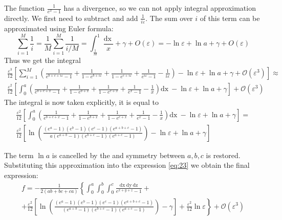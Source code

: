 \documentclass{article}
\newcommand{\dx}{\mathrm{dx}~}
\newcommand{\dy}{\mathrm{dy}~}
\newcommand{\dz}{\mathrm{dz}}
\begin{document}
The function $\frac{1}{e^{x}-1}$ has a divergence, so we can not apply integral approximation directly. We first need to 
subtract and add $\frac{1}{i\varepsilon}$. The sum over $i$ of this term can be approximated using Euler formula:
\begin{equation}
    \label{eq:24}
    \sum_{i=1}^{M}\frac{1}{i}=\frac{1}{M}\sum_{i=1}^{M}\frac{1}{i/M}=\int_{\frac{1}{M}}^{1}\frac{\dx}{x}+\gamma+O(\varepsilon)=-\ln\varepsilon+\ln a+\gamma+O(\varepsilon)
  \end{equation}
Thus we get the integral %
\begin{multline}
  \label{eq:13}
    \frac{\varepsilon^{3}}{12}\left[\sum_{i=1}^{M}\left(     \frac{1}{e^{b+c+i\varepsilon}-1}+
      \frac{1}{1-e^{b+i\varepsilon}}+\frac{1}{1-e^{c+i\varepsilon}}+\frac{1}{e^{i\varepsilon}-1}-\frac{1}{i\varepsilon}\right)-\ln\varepsilon+\ln a+\gamma+\mathcal{O}(\varepsilon^{3})\right]\approx\\
   \frac{\varepsilon^{2}}{12}\left[\int_{0}^{a}\left(     \frac{1}{e^{b+c+x}-1}+
      \frac{1}{1-e^{b+x}}+\frac{1}{1-e^{c+x}}+\frac{1}{e^{x}-1}-\frac{1}{x}\right)\dx-\ln\varepsilon+\ln a+\gamma\right]+\mathcal{O}(\varepsilon^{3})    
\end{multline}
The integral is now taken explicitly, it is equal to
\begin{multline}
  \label{eq:22}
     \frac{\varepsilon^{2}}{12}\left[\int_{0}^{a}\left(     \frac{1}{e^{b+c+x}-1}+
         \frac{1}{1-e^{b+x}}+\frac{1}{1-e^{c+x}}+\frac{1}{e^{x}-1}-\frac{1}{x}\right)\dx-\ln\varepsilon+\ln a+\gamma\right]=\\
     \frac{\varepsilon^{2}}{12}\left[\ln \left(\frac{(e^{a}-1)(e^{b}-1)(e^{c}-1)(e^{a+b+c}-1)}{a (e^{a+b}-1)(e^{b+c}-1)(e^{a+c}-1)}\right)-\ln\varepsilon+\ln a+\gamma\right]
\end{multline}

  

The term $\ln a$ is cancelled by the  and symmetry between $a,b,c$ is restored.
Substituting this approximation into the expression \eqref{eq:23} we obtain 
 the final expression:
\begin{multline}
  \label{eq:3}
 f=-\frac{1}{2(ab+bc+ca)}\left\{\int_{0}^{a} \int_{0}^{b}\int_{0}^{c}\frac{\dx \dy \dz}{e^{x+y+z}-1}+\right.\\
  \left.+\frac{\varepsilon^{2}}{12}\left[\ln\left(\frac{(e^{a}-1)(e^{b}-1)(e^{c}-1)(e^{a+b+c}-1)}{(e^{a+b}-1)(e^{b+c}-1)(e^{a+c}-1)}\right)-
      \gamma\right]+\frac{\varepsilon^{2}}{12}\ln \varepsilon\right\} +\mathcal{O}(\varepsilon^{3})
\end{multline}
\end{document}

